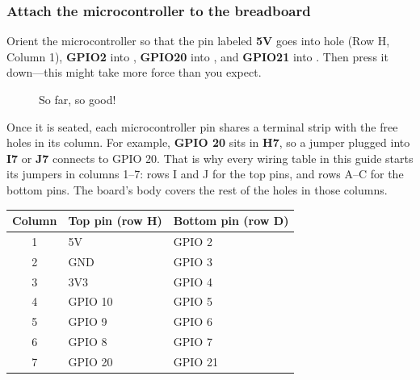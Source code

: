 \subsubsection{Attach the microcontroller to the breadboard}
Orient the microcontroller so that the pin labeled \textbf{5V} goes into hole 
(Row H, Column 1), \textbf{GPIO2} into , \textbf{GPIO20} into
, and \textbf{GPIO21} into . Then press it down---this
might take more force than you expect.

\begin{figure}[H]
    \centering
    \caption{So far, so good!}
\end{figure}

Once it is seated, each microcontroller pin shares a terminal strip with the free holes in its
column. For example, \textbf{GPIO 20} sits in \textbf{H7}, so a jumper plugged into \textbf{I7}
or \textbf{J7} connects to GPIO 20. That is why every wiring table in this guide starts its
jumpers in columns 1--7: rows I and J for the top pins, and rows A--C for the bottom pins. The
board's body covers the rest of the holes in those columns.

\begin{center}
\begin{tabular}{|c|l|l|}
    \hline
    \textbf{Column} & \textbf{Top pin (row H)} & \textbf{Bottom pin (row D)} \\
    \hline
    1 & 5V      & GPIO 2  \\
    2 & GND     & GPIO 3  \\
    3 & 3V3     & GPIO 4  \\
    4 & GPIO 10 & GPIO 5  \\
    5 & GPIO 9  & GPIO 6  \\
    6 & GPIO 8  & GPIO 7  \\
    7 & GPIO 20 & GPIO 21 \\
    \hline
\end{tabular}
\end{center}
